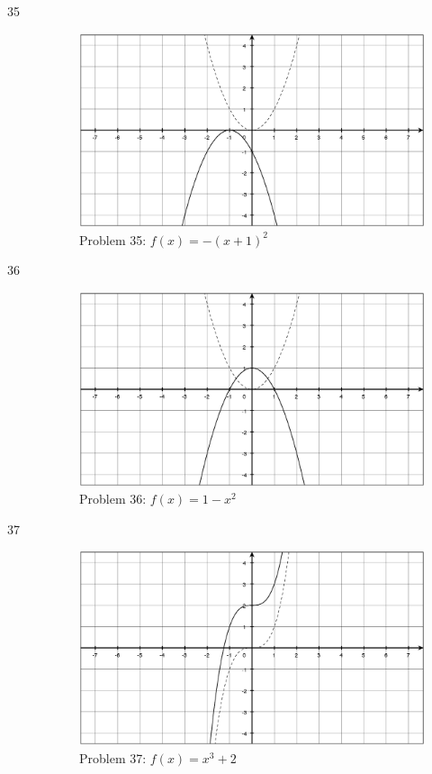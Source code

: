 \documentclass{exam}
\begin{document}
\begin{description}
    \item[35]
      \begin{figure}[H]
        \centering
        \includegraphics[scale=.3]{problem_35.eps}
        \caption*{Problem 35: $f(x) = -(x + 1)^2$}
      \end{figure}

    \item[36]
      \begin{figure}[H]
        \centering
        \includegraphics[scale=.3]{problem_36.eps}
        \caption*{Problem 36: $f(x) = 1 - x^2$}
      \end{figure}

    \item[37]
      \begin{figure}[H]
        \centering
        \includegraphics[scale=.3]{problem_37.eps}
        \caption*{Problem 37: $f(x) = x^3 + 2$}
      \end{figure}


\end{description}
\end{document}
